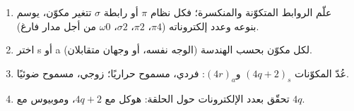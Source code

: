 \begin{method}\label{met:b3:pericyclic:components}
\begin{enumerate}
  \item علّم الروابط المتكوّنة والمنكسرة؛ فكل نظام $\pi$ أو رابطة $\sigma$ تتغير
        مكوّن، يوسم بنوعه وعدد إلكتروناته ($\pi4$، $\pi2$، $\sigma2$، $\omega0$ من أجل
        مدار فارغ).
  \item اختر s أو a لكل مكوّن بحسب الهندسة (الوجه نفسه، أو
        وجهان متقابلان).
  \item عُدّ المكوّنات $(4q + 2)_s$ و$(4r)_a$: فردي، مسموح حراريًا؛ زوجي، مسموح
        ضوئيًا.
  \item تحقّق بعدد الإلكترونات حول الحلقة: هوكل مع $4q + 2$،
        وموبيوس مع $4q$.
\end{enumerate}
\end{method}

